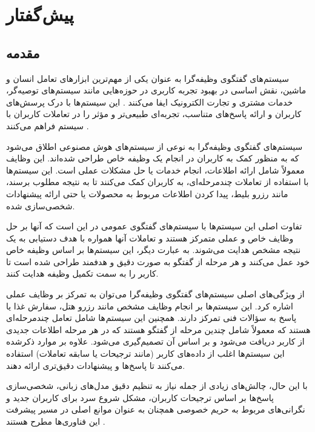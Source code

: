 
\chapter{پیش گفتار}

\section{مقدمه}

سیستم‌های گفتگوی وظیفه‌گرا%
 به عنوان یکی از مهم‌ترین ابزارهای تعامل انسان و ماشین، نقش اساسی در بهبود تجربه کاربری در حوزه‌هایی مانند سیستم‌های توصیه‌گر، خدمات مشتری و تجارت الکترونیک ایفا می‌کنند \cite{camilleri2024artificial}. این سیستم‌ها با درک پرسش‌های کاربران و ارائه پاسخ‌های متناسب، تجربه‌ای طبیعی‌تر و مؤثر را در تعاملات کاربران با سیستم فراهم می‌کنند 
\cite{bocklisch2024task}. 

سیستم‌های گفتگوی وظیفه‌گرا به نوعی از سیستم‌های هوش مصنوعی اطلاق می‌شود که به منظور کمک به کاربران در انجام یک وظیفه خاص طراحی شده‌اند. این وظایف معمولاً شامل ارائه اطلاعات، انجام خدمات یا حل مشکلات عملی است. این سیستم‌ها با استفاده از تعاملات چندمرحله‌ای، به کاربران کمک می‌کنند تا به نتیجه مطلوب برسند، مانند رزرو بلیط، پیدا کردن اطلاعات مربوط به محصولات یا حتی ارائه پیشنهادات شخصی‌سازی شده. 

تفاوت اصلی این سیستم‌ها با سیستم‌های گفتگوی عمومی در این است که آنها بر حل وظایف خاص و عملی متمرکز هستند و تعاملات آنها همواره با هدف دستیابی به یک نتیجه مشخص هدایت می‌شوند. به عبارت دیگر، این سیستم‌ها بر اساس وظیفه خاص خود عمل می‌کنند و هر مرحله از گفتگو به صورت دقیق و هدفمند طراحی شده است تا کاربر را به سمت تکمیل وظیفه هدایت کنند.

از ویژگی‌های اصلی سیستم‌های گفتگوی وظیفه‌گرا می توان به تمرکز بر وظایف عملی اشاره کرد. این سیستم‌ها بر انجام وظایف مشخص مانند رزرو هتل، سفارش غذا یا پاسخ به سؤالات فنی تمرکز دارند. همچنین این سیستم ها شامل تعامل چندمرحله‌ای هستند که معمولاً شامل چندین مرحله از گفتگو هستند که در هر مرحله اطلاعات جدیدی از کاربر دریافت می‌شود و بر اساس آن تصمیم‌گیری می‌شود. علاوه بر موارد ذکرشده این سیستم‌ها اغلب از داده‌های کاربر (مانند ترجیحات یا سابقه تعاملات) استفاده می‌کنند تا پاسخ‌ها و پیشنهادات دقیق‌تری ارائه دهند.
\cite{samarinas2024simulating}

با این حال، چالش‌های زیادی از جمله نیاز به تنظیم دقیق مدل‌های زبانی، شخصی‌سازی پاسخ‌ها بر اساس ترجیحات کاربران، مشکل شروع سرد برای کاربران جدید و نگرانی‌های مربوط به حریم خصوصی همچنان به عنوان موانع اصلی در مسیر پیشرفت این فناوری‌ها مطرح هستند 
\cite{yuan2023user}.

